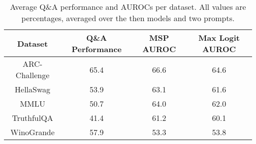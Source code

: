 \begin{table*}
\centering
\begin{tabular}{c|c|c|c}
Dataset & Q\&A Performance & MSP AUROC & Max Logit AUROC\\ \hline
ARC-Challenge & 65.4 & 66.6 & 64.6\\
HellaSwag & 53.9 & 63.1 & 61.6\\
MMLU & 50.7 & 64.0 & 62.0\\
TruthfulQA & 41.4 & 61.2 & 60.1\\
WinoGrande & 57.9 & 53.3 & 53.8\\
\hline
\end{tabular}
\caption{Average Q\&A performance and AUROCs per dataset. All values are percentages, averaged over the then models and two prompts.}
\label{tab:dataset}
\end{table*}
